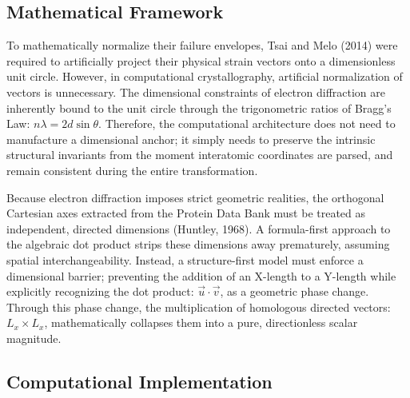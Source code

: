 \documentclass[man]{apa7}
\begin{document}
	\subsection{Mathematical Framework}
	To mathematically normalize their failure envelopes, Tsai and Melo (2014) were required to artificially project their physical strain vectors onto a dimensionless unit circle. However, in computational crystallography, artificial normalization of vectors is unnecessary. The dimensional constraints of electron diffraction are inherently bound to the unit circle through the trigonometric ratios of Bragg's Law: \(n\lambda = 2d \sin\theta\). Therefore, the computational architecture does not need to manufacture a dimensional anchor; it simply needs to preserve the intrinsic structural invariants from the moment interatomic coordinates are parsed, and remain consistent during the entire transformation.
	
	Because electron diffraction imposes strict geometric realities, the orthogonal Cartesian axes extracted from the Protein Data Bank must be treated as independent, directed dimensions (Huntley, 1968). A formula-first approach to the algebraic dot product strips these dimensions away prematurely, assuming spatial interchangeability. Instead, a structure-first model must enforce a dimensional barrier; preventing the addition of an X-length to a Y-length while explicitly recognizing the dot product: \(\vec{u} \cdot \vec{v}\), as a geometric phase change. Through this phase change, the multiplication of homologous directed vectors: \(L_x \times L_x\), mathematically collapses them into a pure, directionless scalar magnitude.
	
	\subsection{Computational Implementation}
	
	
	
	
	 
	
	

	\printbibliography
\end{document}
